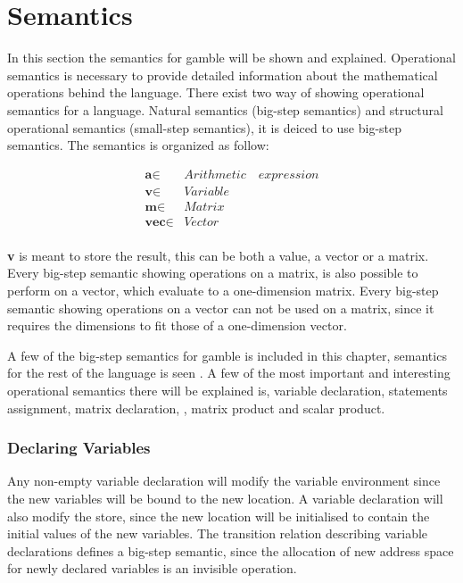 \chapter{Semantics}
In this section the semantics for \gls{gamble} will be shown and explained.
Operational semantics is necessary to provide detailed information about the mathematical operations behind the language.
There exist two way of showing operational semantics for a language.
Natural semantics (big-step semantics) and structural operational semantics (small-step semantics), it is deiced to use big-step semantics.
The semantics is organized as follow:

\begin{align*}
	\textbf{a} \in  &Arithmetic\quad expression\\
	\textbf{v} \in  &Variable\\
	\textbf{m} \in  &Matrix\\
	\textbf{vec} \in  &Vector\\
\end{align*}

\textbf{v} is meant to store the result, this can be both a value, a vector or a matrix.
Every big-step semantic showing operations on a matrix, is also possible to perform on a vector, which evaluate to a one-dimension matrix.
Every big-step semantic showing operations on a vector can not be used on a matrix, since it requires the dimensions to fit those of a one-dimension vector.

A few of the big-step semantics for \gls{gamble} is included in this chapter, semantics for the rest of the language is seen .
A few of the most important and interesting operational semantics there will be explained is, variable declaration, statements assignment, matrix declaration, , matrix product and scalar product.

\subsection*{Declaring Variables}
Any non-empty variable declaration will modify the variable environment since the new variables will be bound to the new location.
A variable declaration will also modify the store, since the new location will be initialised to contain the initial values of the new variables.
The transition relation describing variable declarations defines a big-step semantic, since the allocation of new address space for newly declared variables is an invisible operation.

